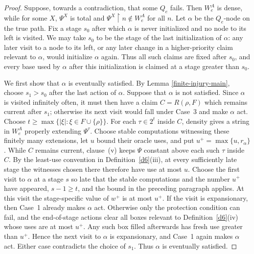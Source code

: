 \documentclass[11pt]{amsart}
\begin{document}
\begin{proof}
Suppose, towards a contradiction, that some $Q_e$ fails.  Then $W_e^A$ is
dense, while for some $X$, $\Psi^X$ is total and $\Psi^X\upharpoonright n\notin W_e^A$ for all $n$.
Let $\alpha$ be the $Q_e$-node on the true path.  Fix a stage $s_0$ after
which $\alpha$ is never initialized and no node to its left is visited.  We
may take $s_0$ to be the stage of the last initialization of $\alpha$: any
later visit to a node to its left, or any later change in a higher-priority
claim relevant to $\alpha$, would initialize $\alpha$ again.  Thus all such
claims are fixed after $s_0$, and every base used by $\alpha$ after this
initialization is claimed at a stage greater than $s_0$.

We first show that $\alpha$ is eventually satisfied.  By Lemma
\ref{finite-injury-main}, choose $s_1>s_0$ after the last action of $\alpha$.
Suppose that $\alpha$ is not satisfied.  Since $\alpha$ is visited infinitely
often, it must then have a claim $C=R(\rho,F)$ which remains current after
$s_1$; otherwise its next visit would fall under Case~3 and make $\alpha$ act.
Choose $t\geq\max\{|\xi|:\xi\in F\cup\{\rho\}\}$.
For each $\tau\in2^t$ inside $C$, density gives a string in $W_e^A$ properly
extending $\Psi^\tau$.  Choose stable computations witnessing these finitely
many extensions, let $u$ bound their oracle uses, and put
$u^+=\max\{u,r_\alpha\}$.  While $C$ remains current, clause~(v) keeps $\Psi$
constant above each such $\tau$ inside $C$.  By the least-use convention in
Definition~\ref{d6}(iii), at every sufficiently late stage the witnesses
chosen there therefore have use at most $u$.
Choose the first visit to $\alpha$ at a stage $s$ so late that the stable
computations and the number $u^+$ have appeared, $s-1\geq t$, and the bound in
the preceding paragraph applies.  At this visit the stage-specific value of
$w^+$ is at most $u^+$.  If the visit is expansionary, then Case~1 already makes
$\alpha$ act.  Otherwise only the protection condition can fail, and the
end-of-stage actions clear all boxes relevant to Definition~\ref{d6}(iv) whose
uses are at most $u^+$.  Any such box filled afterwards has fresh use greater
than $u^+$.  Hence the next visit to $\alpha$ is expansionary, and Case~1 again
makes $\alpha$ act.  Either case contradicts the choice of $s_1$.  Thus
$\alpha$ is eventually satisfied.


\end{proof}
\end{document}
